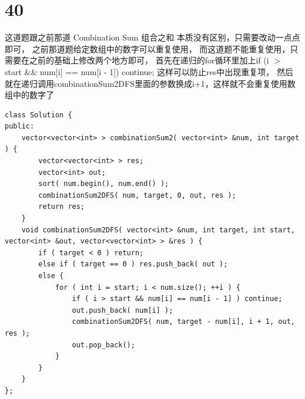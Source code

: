 \documentclass[12pt,a4paper]{article}
\begin{document}
\section{40}
\begin{CJK}{UTF8}{gbsn}
这道题跟之前那道 Combination Sum 组合之和 本质没有区别，只需要改动一点点即可，
之前那道题给定数组中的数字可以重复使用，
而这道题不能重复使用，只需要在之前的基础上修改两个地方即可，
首先在递归的for循环里加上if (i $>$ start \&\& num[i] == num[i - 1]) continue; 
这样可以防止res中出现重复项，
然后就在递归调用combinationSum2DFS里面的参数换成i+1，这样就不会重复使用数组中的数字了
\end{CJK}
\begin{lstlisting}
class Solution {
public:
	vector<vector<int> > combinationSum2( vector<int> &num, int target ) {
		vector<vector<int> > res;
		vector<int> out;
		sort( num.begin(), num.end() );
		combinationSum2DFS( num, target, 0, out, res );
		return res;
	}
	void combinationSum2DFS( vector<int> &num, int target, int start, vector<int> &out, vector<vector<int> > &res ) {
		if ( target < 0 ) return;
		else if ( target == 0 ) res.push_back( out );
		else {
			for ( int i = start; i < num.size(); ++i ) {
				if ( i > start && num[i] == num[i - 1] ) continue;
				out.push_back( num[i] );
				combinationSum2DFS( num, target - num[i], i + 1, out, res );
				out.pop_back();
			}
		}
	}
};
\end{lstlisting}
\end{document}

